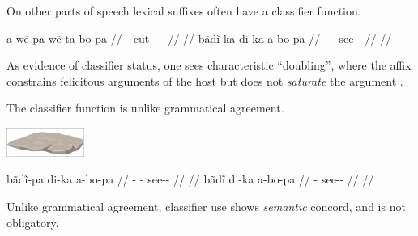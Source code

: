 \documentclass{beamer}
\begin{document}
\begin{frame}{On other parts of speech lexical suffixes often have a classifier function.}
  
  \pex
  \a\begingl
  \gla a-wẽ pa-wẽ-ta-bo-pa //
  \glb {}- cut---- //
  \glft {} //
  \endgl
  \a\begingl
  \gla bãdĩ-ka di-ka a-bo-pa //
  \glb {}- - see-- //
  \glft {} //
  \endgl
  \xe

  As evidence of classifier status, one sees characteristic ``doubling'', where the affix constrains felicitous arguments of the host but does not \emph{saturate} the argument \citep{Mithun1986, Rosen1998}.
  
\end{frame}

\begin{frame}{The classifier function is unlike grammatical agreement.}

  \includegraphics[width=1in]{flatstone.png}

  \pex
  \a\begingl
  \gla bãdĩ-pa di-ka a-bo-pa //
  \glb {}- - see-- //
  \glft {} //
  \endgl
  \a\begingl
  \gla bãdĩ di-ka a-bo-pa //
  \glb {} - see-- //
  \glft {} //
  \endgl
  \xe

  Unlike grammatical agreement, classifier use shows \emph{semantic} concord, and is not obligatory.
  
\end{frame}


\end{document}
